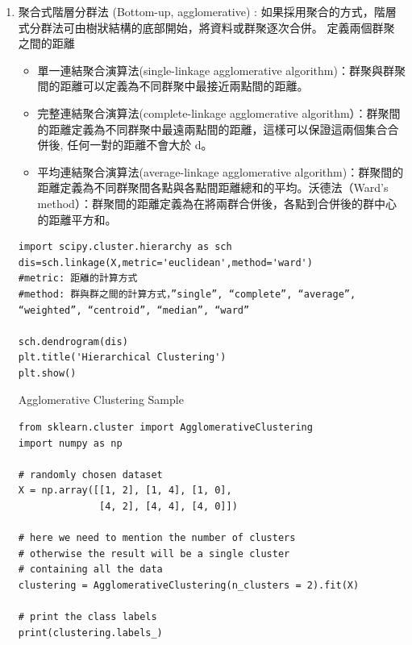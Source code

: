 \documentclass[a4paper,12pt]{article}
\begin{document}
\begin{enumerate}
\item 聚合式階層分群法 (Bottom-up, agglomerative) : 如果採用聚合的方式，階層式分群法可由樹狀結構的底部開始，將資料或群聚逐次合併。
\label{sec:org10c4eff}
定義兩個群聚之間的距離\\
\begin{itemize}
\item 單一連結聚合演算法(single-linkage agglomerative algorithm)：群聚與群聚間的距離可以定義為不同群聚中最接近兩點間的距離。\\
\item 完整連結聚合演算法(complete-linkage agglomerative algorithm）：群聚間的距離定義為不同群聚中最遠兩點間的距離，這樣可以保證這兩個集合合併後, 任何一對的距離不會大於 d。\\
\item 平均連結聚合演算法(average-linkage agglomerative algorithm)：群聚間的距離定義為不同群聚間各點與各點間距離總和的平均。沃德法（Ward's method）：群聚間的距離定義為在將兩群合併後，各點到合併後的群中心的距離平方和。\\
\end{itemize}
\lstset{breaklines=true,language=Python,label= ,caption= ,captionpos=b,firstnumber=1,numbers=left}
\begin{lstlisting}
import scipy.cluster.hierarchy as sch
dis=sch.linkage(X,metric='euclidean',method='ward')
#metric: 距離的計算方式
#method: 群與群之間的計算方式，”single”, “complete”, “average”, “weighted”, “centroid”, “median”, “ward”

sch.dendrogram(dis)
plt.title('Hierarchical Clustering')
plt.show()
\end{lstlisting}

Agglomerative Clustering Sample\\
\lstset{breaklines=true,language=Python,label= ,caption= ,captionpos=b,firstnumber=1,numbers=left}
\begin{lstlisting}
from sklearn.cluster import AgglomerativeClustering
import numpy as np

# randomly chosen dataset
X = np.array([[1, 2], [1, 4], [1, 0],
              [4, 2], [4, 4], [4, 0]])

# here we need to mention the number of clusters
# otherwise the result will be a single cluster
# containing all the data
clustering = AgglomerativeClustering(n_clusters = 2).fit(X)

# print the class labels
print(clustering.labels_)
\end{lstlisting}


\end{enumerate}
\end{document}
